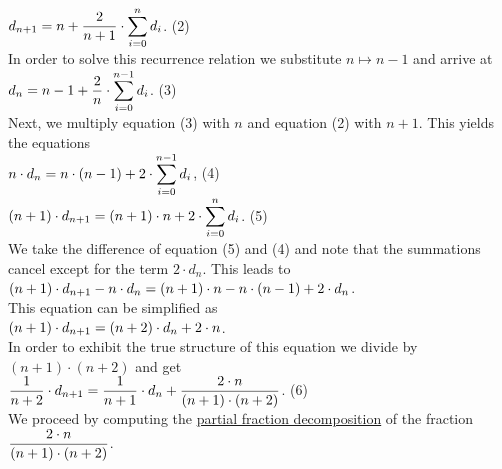 \\[0.2cm]
\hspace*{1.3cm}
$\displaystyle d_{n+1} = n + \frac{2}{n+1} \cdot \sum\limits_{i=0}^n d_i$. \hspace*{\fill} (2)
\\[0.2cm] 
In order to solve this recurrence relation we substitute $n \mapsto n-1$ and arrive at
\\[0.2cm]
\hspace*{1.3cm}
$\displaystyle d_{n} = n-1 + \frac{2}{n} \cdot \sum\limits_{i=0}^{n-1} d_i$.  \hspace*{\fill} (3)
\\[0.2cm]
Next, we multiply equation (3) with $n$ and equation (2) with $n+1$.  This yields the equations
\\[0.2cm]
\hspace*{1.3cm}
$\displaystyle n \cdot d_{n} = n\cdot(n-1) + 2 \cdot \sum\limits_{i=0}^{n-1} d_i$,            \hspace*{\fill}
(4) 
\\[0.2cm]
\hspace*{1.3cm}
$\displaystyle (n+1)\cdot d_{n+1}  =  (n+1)\cdot n + 2 \cdot \sum\limits_{i=0}^n d_i$.   \hspace*{\fill} (5) 
\\[0.2cm]
We take the difference of  equation (5) and (4) and note that the summations cancel except for
the term $2\cdot d_{n}$.  This leads to
\\[0.2cm]
\hspace*{1.3cm}
$(n+1)\cdot d_{n+1} - n \cdot \displaystyle d_{n} = (n+1)\cdot n - n \cdot (n-1) + 2 \cdot d_{n}$.
\\[0.2cm] 
This equation can be simplified as
\\[0.2cm]
\hspace*{1.3cm}
$(n+1)\cdot d_{n+1} = (n+2) \cdot \displaystyle d_{n} + 2 \cdot n$.
\\[0.2cm] 
In order to exhibit the true structure of this equation we divide by $(n+1) \cdot(n+2)$ and
get 
\\[0.2cm]
\hspace*{1.3cm}
$\displaystyle\frac{1}{n+2} \cdot d_{n+1} = \frac{1}{n+1}\cdot d_{n} + \frac{2\cdot n}{(n+1)\cdot(n+2)}$. \hspace*{\fill} (6) 
\\[0.2cm]
We proceed by computing the 
\href{http://en.wikipedia.org/wiki/Partial_fraction}{partial fraction decomposition}
of the fraction
\\[0.2cm]
\hspace*{1.3cm}
$\displaystyle\frac{2\cdot n}{(n+1)\cdot(n+2)}$.
